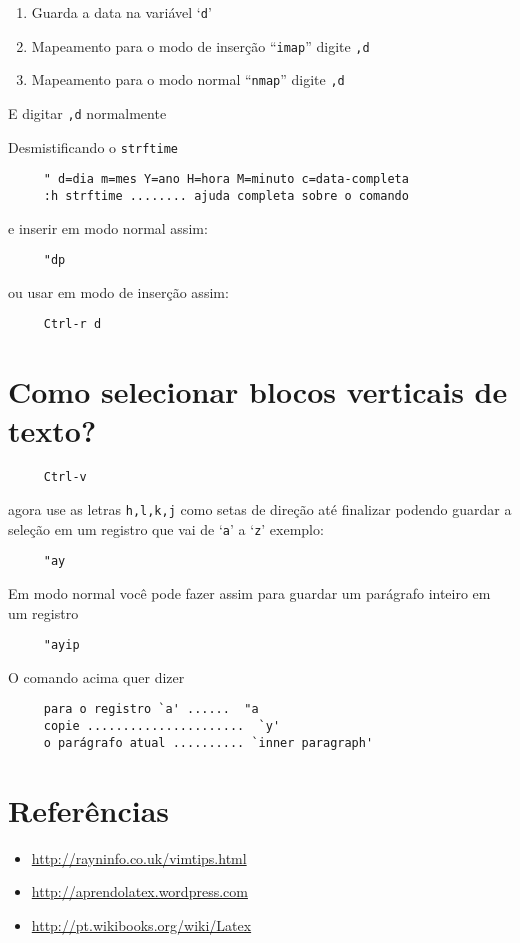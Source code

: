 \begin{enumerate}
 \item  Guarda a data na variável `{\tt d}'
 \item  Mapeamento para o modo de inserção ``{\tt imap}'' digite {\tt ,d}
 \item  Mapeamento para o modo normal ``{\tt nmap}'' digite {\tt ,d}
\end{enumerate}

E digitar {\tt ,d} normalmente

Desmistificando o {\tt strftime}
\begin{verbatim}
     " d=dia m=mes Y=ano H=hora M=minuto c=data-completa
     :h strftime ........ ajuda completa sobre o comando
\end{verbatim}

e inserir em modo normal assim:

\begin{verbatim}
     "dp
\end{verbatim}

ou usar em modo de inserção assim:

\begin{verbatim}
     Ctrl-r d
\end{verbatim}

\section{Como selecionar blocos verticais de texto?}
\label{Como selecionar blocos verticais de texto?}

\begin{verbatim}
     Ctrl-v
\end{verbatim}

agora use as letras {\tt h,l,k,j} como setas de direção até finalizar
podendo guardar a seleção em um registro que vai de `{\tt a}' a `{\tt z}' exemplo:

\begin{verbatim}
     "ay
\end{verbatim}

Em modo normal você pode fazer assim para guardar um parágrafo inteiro em um registro

\begin{verbatim}
     "ayip
\end{verbatim}

O comando acima quer dizer

\begin{verbatim}
     para o registro `a' ......  "a
     copie ......................  `y'
     o parágrafo atual .......... `inner paragraph'
\end{verbatim}

\section{Referências}
\label{Referências}

\begin{itemize}
   \item \url{http://rayninfo.co.uk/vimtips.html}
   \item \url{http://aprendolatex.wordpress.com}
   \item \url{http://pt.wikibooks.org/wiki/Latex}
\end{itemize}
